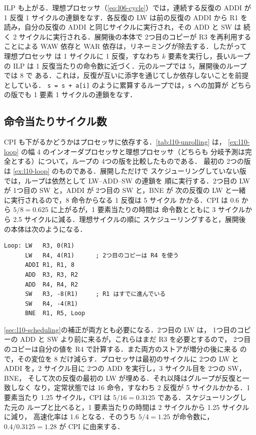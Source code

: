 \documentclass[../main.tex]{subfiles}
\begin{document}
ILP も上がる．理想プロセッサ（\cref{eq:l06-cycle}）では，連続する反復の
ADDI が 1 反復 1 サイクルの連鎖をなす．各反復の LW は前の反復の ADDI から
R1 を読み，自分の反復の ADDI と同じサイクルに実行され，その ADD と SW は
続く 2 サイクルに実行される．展開後の本体で 2つ目のコピーが R3 を再利用する
ことによる WAW 依存と WAR 依存は，リネーミングが除去する．したがって理想プロセッサ
は 1 サイクルに 1 反復，すなわち $k$ 要素を実行し，長いループの ILP は
1 反復当たりの命令数に近づく．元のループでは 5，展開後のループでは 8 で
ある．これは，反復が互いに添字を通じてしか依存しないことを前提としている．
\texttt{s = s + a[i]} のように累算するループでは，\texttt{s} への加算が
どちらの版でも 1 要素 1 サイクルの連鎖をなす．

\subsection{命令当たりサイクル数}
\label{sec:l10-unrolling-cpi}

CPI も下がるかどうかはプロセッサに依存する．\cref{tab:l10-unrolling} は，
\cref{ex:l10-loop} の幅 4 のインオーダプロセッサと理想プロセッサ（どちらも
分岐予測は完全とする）について，ループの 4つの版を比較したものである．
最初の 2つの版は \cref{ex:l10-loop} のものである．展開しただけで
スケジューリングしていない版では，ループは依然として LW--ADD--SW の連鎖を
順に実行する．2つ目の LW が 1つ目の SW と，ADDI が 2つ目の SW と，BNE が
次の反復の LW と一緒に実行されるので，8 命令からなる 1 反復は 5 サイクル
かかる．CPI は 0.6 から $5/8 = 0.625$ に上がるが，1 要素当たりの時間は
命令数とともに 3 サイクルから 2.5 サイクルに減る．理想サイクルの順に
スケジューリングすると，展開後の本体は次のようになる．
\begin{lstlisting}[language={[x86masm]Assembler}, numbers=none]
Loop: LW   R3, 0(R1)
      LW   R4, 4(R1)      ; 2つ目のコピーは R4 を使う
      ADDI R1, R1, 8
      ADD  R3, R3, R2
      ADD  R4, R4, R2
      SW   R3, -8(R1)     ; R1 はすでに進んでいる
      SW   R4, -4(R1)
      BNE  R1, R5, Loop
\end{lstlisting}
\cref{sec:l10-scheduling}の補正が両方とも必要になる．2つ目の LW は，
1つ目のコピーの ADD と SW より前に来るが，これらはまだ R3 を必要とするので，
2つ目のコピーは自分の値を R4 で計算する．また両方のストアが増分の後に来る
ので，その変位を 8 だけ減らす．プロセッサは最初のサイクルに 2つの LW と
ADDI を，2 サイクル目に 2つの ADD を実行し，3 サイクル目を 2つの SW，BNE，
そして次の反復の最初の LW が埋める．それ以降はグループが反復と一致しなく
なり，定常状態では 16 命令，すなわち 2 反復が 5 サイクルかかる．1 要素当たり
1.25 サイクル，CPI は $5/16 = 0.3125$ である．スケジューリングした元の
ループと比べると，1 要素当たりの時間は 2 サイクルから 1.25 サイクルに減り，
高速化率は 1.6 となる．そのうち $5/4 = 1.25$ が命令数に，
$0.4/0.3125 = 1.28$ が CPI に由来する．
\end{document}
